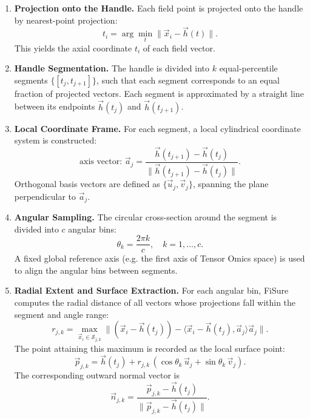         \begin{enumerate}
            \item \textbf{Projection onto the Handle.}  
                  Each field point is projected onto the handle by nearest-point projection:
                  \[
                      t_i = \arg\min_t \| \vec{x}_i - \vec{h}(t) \|.
                  \]
                  This yields the axial coordinate \(t_i\) of each field vector.

            \item \textbf{Handle Segmentation.}  
                  The handle is divided into \(k\) equal-percentile segments 
                  \( \{[t_j, t_{j+1}]\} \), such that each segment corresponds to 
                  an equal fraction of projected vectors.  
                  Each segment is approximated by a straight line between its 
                  endpoints \(\vec{h}(t_j)\) and \(\vec{h}(t_{j+1})\).

            \item \textbf{Local Coordinate Frame.}  
                  For each segment, a local cylindrical coordinate system is constructed:
                  \[
                      \text{axis vector: } \vec{a}_j = \frac{\vec{h}(t_{j+1}) - \vec{h}(t_j)}
                                          {\|\vec{h}(t_{j+1}) - \vec{h}(t_j)\|}.
                  \]
                  Orthogonal basis vectors are defined as 
                  \( \{\vec{u}_j, \vec{v}_j\} \), spanning the plane perpendicular to \(\vec{a}_j\).

            \item \textbf{Angular Sampling.}  
                  The circular cross-section around the segment is divided into 
                  \(c\) angular bins:
                  \[
                      \theta_k = \frac{2\pi k}{c}, \quad k = 1,\ldots,c.
                  \]
                  A fixed global reference axis (e.g. the first axis of Tensor Omics space) 
                  is used to align the angular bins between segments.

            \item \textbf{Radial Extent and Surface Extraction.}  
                  For each angular bin, FiSure computes the radial distance of all 
                  vectors whose projections fall within the segment and angle range:
                  \[
                      r_{j,k} = \max_{\vec{x}_i \in \mathcal{S}_{j,k}} 
                      \| (\vec{x}_i - \vec{h}(t_j)) - 
                      \langle \vec{x}_i - \vec{h}(t_j), \vec{a}_j \rangle \vec{a}_j \|.
                  \]
                  The point attaining this maximum is recorded as the local surface point:
                  \[
                      \vec{p}_{j,k} = \vec{h}(t_j) + r_{j,k} \,
                           (\cos\theta_k \, \vec{u}_j + \sin\theta_k \, \vec{v}_j).
                  \]
                  The corresponding outward normal vector is
                  \[
                      \vec{n}_{j,k} = 
                      \frac{\vec{p}_{j,k} - \vec{h}(t_j)}
                      {\|\vec{p}_{j,k} - \vec{h}(t_j)\|}.
                  \]


\end{enumerate}
